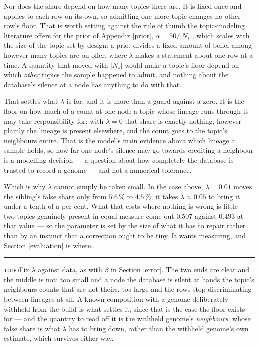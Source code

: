 \documentclass[pdflatex,sn-vancouver-num]{sn-jnl}
\newif\ifshowtodos \showtodostrue
\newcommand{\todo}[1]{%
  \ifshowtodos
    \par\addvspace{0.7\baselineskip}%
    \begin{list}{}{%
      \setlength{\leftmargin}{1.5em}%
      \setlength{\rightmargin}{1.5em}%
      \setlength{\topsep}{0pt}%
      \setlength{\partopsep}{0pt}%
      \setlength{\parsep}{0.5\baselineskip}%
      \setlength{\itemsep}{0pt}%
    }%
    \item[]\footnotesize\color{black!70}%
      \textcolor{orange!65!black}{\rule[-0.2ex]{2pt}{1.15ex}}\hspace{0.55em}%
      \textcolor{orange!65!black}{\textsc{todo}}\hspace{0.6em}\ignorespaces#1%
    \end{list}%
    \addvspace{0.7\baselineskip}%
  \fi%
}
\begin{document}
    Nor does the share depend on how many topics there are. It is fixed once and applies to each row
    on its own, so admitting one more topic changes no other row's floor. That is worth setting
    against the rule of thumb the topic-modeling literature offers for the prior of
    Appendix \ref{prior}, $\alpha = 50 / \lvert N_s \rvert$, which scales with the size of the topic
    set by design: a prior divides a fixed amount of belief among however many topics are on offer,
    where $\lambda$ makes a statement about one row at a time. A quantity that moved with $\lvert N_s \rvert$ would make a topic's floor depend on which \emph{other} topics the sample happened to
    admit, and nothing about the database's silence at a node has anything to do with that.

    That settles what $\lambda$ is for, and it is more than a guard against a zero. It is the floor
    on how much of a count at one node a topic whose lineage runs through it may take
    responsibility for: with $\lambda = 0$ that share is exactly nothing, however plainly the
    lineage is present elsewhere, and the count goes to the topic's neighbours entire. That is the
    model's main evidence about which lineage a sample holds, so how far one node's silence may go
    towards crediting a neighbour is a modelling decision --- a question about how completely the
    database is trusted to record a genome --- and not a numerical tolerance.

    Which is why $\lambda$ cannot simply be taken small. In the case above, $\lambda = 0.01$ moves
    the sibling's false share only from $5.6\,\%$ to $4.5\,\%$; it takes $\lambda \approx 0.05$ to
    bring it under a tenth of a per cent. What that costs where nothing is wrong is little --- two
    topics genuinely present in equal measure come out $0.507$ against $0.493$ at that value --- so
    the parameter is set by the size of what it has to repair rather than by an instinct that a
    correction ought to be tiny. It wants measuring, and Section \ref{evaluation} is where.

    \todo{Fix $\lambda$ against data, as with $\beta$ in Section \ref{error}. The two ends are clear
    and the middle is not: too small and a node the database is silent at hands the topic's
    neighbours counts that are not theirs, too large and the rows stop discriminating between
    lineages at all. A known composition with a genome deliberately withheld from the build is what
    settles it, since that is the case the floor exists for --- and the quantity to read off it is
    the withheld genome's \emph{neighbours}, whose false share is what $\lambda$ has to bring down,
    rather than the withheld genome's own estimate, which survives either way.}
\end{document}
